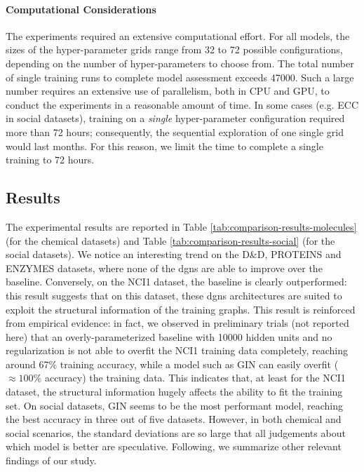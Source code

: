 \paragraph{Computational Considerations}
The experiments required an extensive computational effort. For all models, the sizes of the hyper-parameter grids range from 32 to 72 possible configurations, depending on the number of hyper-parameters to choose from. The total number of single training runs to complete model assessment exceeds 47000. Such a large number requires an extensive use of parallelism, both in CPU and GPU, to conduct the experiments in a reasonable amount of time. In some cases (e.g. ECC in social datasets), training on a \emph{single} hyper-parameter configuration required more than 72 hours; consequently, the sequential exploration of one single grid would last months. For this reason, we limit the time to complete a single training to 72 hours.

\subsection{Results}
The experimental results are reported in Table \ref{tab:comparison-results-molecules} (for the chemical datasets) and Table \ref{tab:comparison-results-social} (for the social datasets). We notice an interesting trend on the D\&D, PROTEINS and ENZYMES datasets, where none of the \glspl{dgn} are able to improve over the baseline. Conversely, on the NCI1 dataset, the baseline is clearly outperformed: this result suggests that on this dataset, these \glspl{dgn} architectures are suited to exploit the structural information of the training graphs. This result is reinforced from empirical evidence: in fact, we observed in preliminary trials (not reported here) that an overly-parameterized baseline with 10000 hidden units and no regularization is not able to overfit the NCI1 training data completely, reaching around 67\% training accuracy, while a model such as GIN can easily overfit ($\approx 100\%$ accuracy) the training data. This indicates that, at least for the NCI1 dataset, the structural information hugely affects the ability to fit the training set. On social datasets, GIN seems to be the most performant model, reaching the best accuracy in three out of five datasets. However, in both chemical and social scenarios, the standard deviations are so large that all judgements about which model is better are speculative. Following, we summarize other relevant findings of our study.

